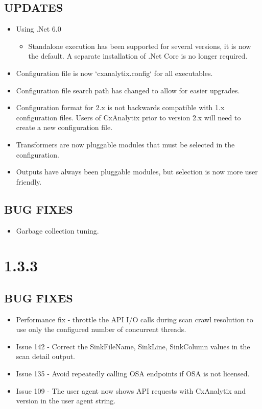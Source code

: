 \subsection*{UPDATES}
    \begin{itemize}
        \item Using .Net 6.0
            \begin{itemize}
                \item Standalone execution has been supported for several versions, it is now the default.  A separate installation of .Net Core is no longer required.
            \end{itemize}
        \item Configuration file is now `cxanalytix.config` for all executables.
        \item Configuration file search path has changed to allow for easier upgrades.
        \item Configuration format for 2.x is not backwards compatible with 1.x configuration files.  Users of CxAnalytix prior to version 2.x will need 
        to create a new configuration file.
        \item Transformers are now pluggable modules that must be selected in the configuration.
        \item Outputs have always been pluggable modules, but selection is now more user friendly.
    \end{itemize}

\subsection*{BUG FIXES}
    \begin{itemize}
        \item Garbage collection tuning.
    \end{itemize}


\section{1.3.3}
\subsection*{BUG FIXES}
    \begin{itemize}
        \item Performance fix - throttle the API I/O calls during scan crawl resolution to use only the configured number of concurrent threads.
        \item Issue 142 - Correct the SinkFileName, SinkLine, SinkColumn values in the scan detail output.
        \item Issue 135 - Avoid repeatedly calling OSA endpoints if OSA is not licensed.
        \item Issue 109 - The user agent now shows API requests with CxAnalytix and version in the user agent string.
    \end{itemize}


